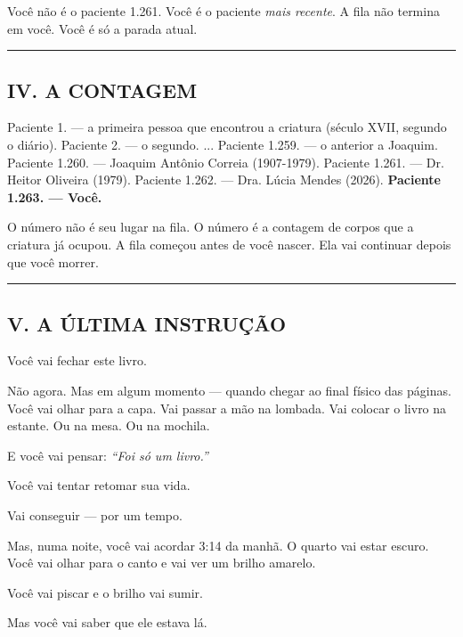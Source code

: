 \noindent Você não é o paciente 1.261.
Você é o paciente \textit{mais recente}.
A fila não termina em você.
Você é só a parada atual.

\vspace{0.5em}\noindent\rule{\textwidth}{0.5pt}\vspace{0.5em}

\subsection*{IV. A CONTAGEM}

\noindent Paciente 1. --- a primeira pessoa que encontrou a criatura (século XVII, segundo o diário).
Paciente 2. --- o segundo.
...
Paciente 1.259. --- o anterior a Joaquim.
Paciente 1.260. --- Joaquim Antônio Correia (1907-1979).
Paciente 1.261. --- Dr. Heitor Oliveira (1979).
Paciente 1.262. --- Dra. Lúcia Mendes (2026).
\textbf{Paciente 1.263. --- Você.}

\noindent O número não é seu lugar na fila.
O número é a contagem de corpos que a criatura já ocupou.
A fila começou antes de você nascer.
Ela vai continuar depois que você morrer.

\vspace{0.5em}\noindent\rule{\textwidth}{0.5pt}\vspace{0.5em}

\subsection*{V. A ÚLTIMA INSTRUÇÃO}

\noindent Você vai fechar este livro.

\noindent Não agora. Mas em algum momento --- quando chegar ao final físico das páginas. Você vai olhar para a capa. Vai passar a mão na lombada. Vai colocar o livro na estante. Ou na mesa. Ou na mochila.

\noindent E você vai pensar: \textit{\textquotedblleft{}Foi só um livro.\textquotedblright{}}

\noindent Você vai tentar retomar sua vida.

\noindent Vai conseguir --- por um tempo.

\noindent Mas, numa noite, você vai acordar 3:14 da manhã. O quarto vai estar escuro. Você vai olhar para o canto e vai ver um brilho amarelo.

\noindent Você vai piscar e o brilho vai sumir.

\noindent Mas você vai saber que ele estava lá.

